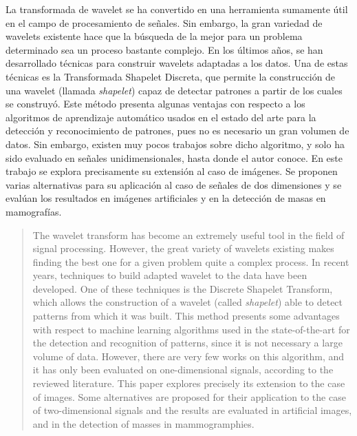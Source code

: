 \begin{resumen}
	La transformada de wavelet se ha convertido en una herramienta sumamente útil en el campo de procesamiento
	de señales. Sin embargo, la gran variedad de wavelets existente hace que la búsqueda de la mejor para 
	un problema determinado sea un proceso bastante complejo. En los últimos años, se han desarrollado
	técnicas para construir wavelets
	adaptadas a los datos. Una de estas técnicas es la Transformada Shapelet Discreta, que
	permite la construcción de una wavelet (llamada \textit{shapelet}) capaz de detectar patrones a partir de los cuales
	se construyó. Este método presenta algunas ventajas con respecto a los algoritmos de aprendizaje automático 
	usados en el estado del 
	arte para la detección y reconocimiento de patrones, pues no es necesario un gran volumen de datos. Sin embargo,
	existen muy pocos trabajos sobre dicho algoritmo, y solo ha sido evaluado en señales unidimensionales, hasta 
	donde el autor conoce. En este
	trabajo se explora precisamente su extensión al caso de imágenes. Se proponen varias alternativas para su aplicación
	al caso de señales de dos dimensiones y se evalúan los resultados en imágenes artificiales y en la detección de masas en mamografías.
\end{resumen}

\begin{abstract}
	The wavelet transform has become an extremely useful tool
	in the field of signal processing. However, the great variety of wavelets
	existing makes finding the best one for a given problem
	quite a complex process. In recent years, techniques to build 
	adapted wavelet to the data have been developed. One of these techniques is the 
	Discrete Shapelet Transform, which allows the construction of a wavelet (called \textit{shapelet})
	able to detect patterns from which it was built. This method presents
	some advantages with respect to machine learning algorithms used in the state-of-the-art 
	for the detection and recognition of patterns, since it is not necessary a large volume
	of data. However, there are very few works on this algorithm, and it has only
	been evaluated on one-dimensional signals, according to the reviewed literature. 
	This paper explores precisely
	its extension to the case of images. Some alternatives are proposed for their application to the case of
	two-dimensional signals and the results are evaluated in artificial images, and in the
	detection of masses in mammogramphies.
\end{abstract}
